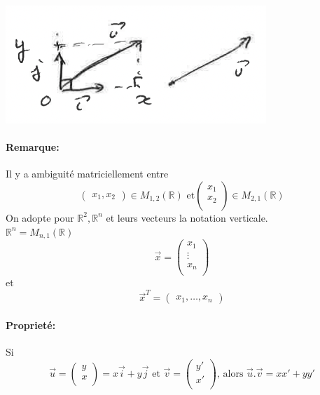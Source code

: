 \documentclass{article}
\begin{document}
\includegraphics{images/image06.png}

\paragraph{Remarque:}

Il y a ambiguité matriciellement entre
$$
\left( 
    \begin{array}{c}
    x_1,
    x_2
    \end{array}
\right) \in M_{1, 2}(\mathbb{R}) \mbox{ et}
\left( 
    \begin{array}{c}
    x_1 \\
    x_2 \\
    \end{array}
\right) \in M_{2, 1}(\mathbb{R})
$$
On adopte pour $\mathbb{R}^2, \mathbb{R}^n$ et leurs vecteurs la notation verticale. \\
$\mathbb{R}^n = M_{n, 1}(\mathbb{R})$
$$
\vec{x} = 
\left( 
    \begin{array}{c}
    x_1 \\
    \vdots \\
    x_n \\
    \end{array}
\right)
$$
et 
$$
\vec{x}^T =
\left( 
    \begin{array}{c}
    x_1,
    \dots,
    x_n
    \end{array}
\right)
$$

\paragraph{Proprieté:}

Si
$$
\vec{u} = 
\left( 
    \begin{array}{c}
        y \\
        x \\
    \end{array}
\right) = x \vec{i} + y \vec{j} 
\mbox{ et } \vec{v} = 
\left( 
    \begin{array}{c}
        y' \\
        x' \\
    \end{array}
\right)\mbox{, alors } \vec{u} . \vec{v} = xx' + yy'
$$
\end{document}
